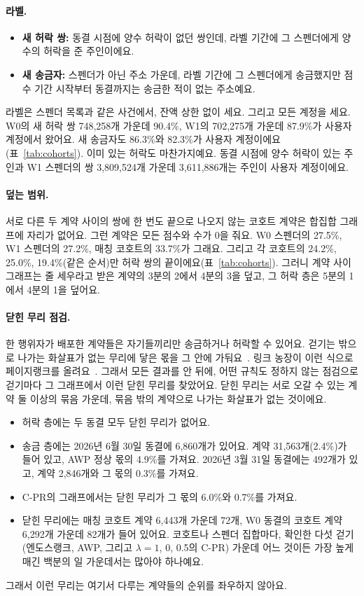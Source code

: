 \paragraph{라벨.}
\begin{itemize}
\item \textbf{새 허락 쌍:} 동결 시점에 양수 허락이 없던 쌍인데, 라벨 기간에 그 스펜더에게 양수의 허락을 준 주인이에요.
\item \textbf{새 송금자:} 스펜더가 아닌 주소 가운데, 라벨 기간에 그 스펜더에게 송금했지만 점수 기간 시작부터 동결까지는 송금한 적이 없는 주소예요.
\end{itemize}
라벨은 스펜더 목록과 같은 사건에서, 잔액 상한 없이 세요. 그리고 모든 계정을 세요. W0의 새 허락 쌍 748,258개 가운데 90.4\%, W1의 702,275개 가운데 87.9\%가 사용자 계정에서 왔어요. 새 송금자도 86.3\%와 82.3\%가 사용자 계정이에요(표~\ref{tab:cohorts}). 이미 있는 허락도 마찬가지예요. 동결 시점에 양수 허락이 있는 주인과 W1 스펜더의 쌍 3,809,524개 가운데 3,611,886개는 주인이 사용자 계정이에요.

\paragraph{덮는 범위.}
서로 다른 두 계약 사이의 쌍에 한 번도 끝으로 나오지 않는 코호트 계약은 합집합 그래프에 자리가 없어요. 그런 계약은 모든 점수와 수가 0을 줘요. W0 스펜더의 27.5\%, W1 스펜더의 27.2\%, 매칭 코호트의 33.7\%가 그래요. 그리고 각 코호트의 24.2\%, 25.0\%, 19.4\%(같은 순서)만 허락 쌍의 끝이에요(표~\ref{tab:cohorts}). 그러니 계약 사이 그래프는 줄 세우라고 받은 계약의 3분의 2에서 4분의 3을 덮고, 그 허락 층은 5분의 1에서 4분의 1을 덮어요.

\paragraph{닫힌 무리 점검.}
한 행위자가 배포한 계약들은 자기들끼리만 송금하거나 허락할 수 있어요. 걷기는 밖으로 나가는 화살표가 없는 무리에 닿은 몫을 그 안에 가둬요~\cite{langville2006pagerank}. 링크 농장이 이런 식으로 페이지랭크를 올려요~\cite{gyongyi2005alliances}. 그래서 모든 결과를 안 뒤에, 어떤 규칙도 정하지 않는 점검으로 걷기마다 그 그래프에서 이런 닫힌 무리를 찾았어요. 닫힌 무리는 서로 오갈 수 있는 계약 둘 이상의 묶음 가운데, 묶음 밖의 계약으로 나가는 화살표가 없는 것이에요.
\begin{itemize}
\item 허락 층에는 두 동결 모두 닫힌 무리가 없어요.
\item 송금 층에는 2026년 6월 30일 동결에 6,860개가 있어요. 계약 31,563개(2.4\%)가 들어 있고, AWP 정상 몫의 4.9\%를 가져요. 2026년 3월 31일 동결에는 492개가 있고, 계약 2,846개와 그 몫의 0.3\%를 가져요.
\item C-PR의 그래프에서는 닫힌 무리가 그 몫의 6.0\%와 0.7\%를 가져요.
\item 닫힌 무리에는 매칭 코호트 계약 6,443개 가운데 72개, W0 동결의 코호트 계약 6,292개 가운데 82개가 들어 있어요. 코호트나 스펜더 집합마다, 확인한 다섯 걷기(엔도스랭크, AWP, 그리고 $\lambda=1$, 0, 0.5의 C-PR) 가운데 어느 것이든 가장 높게 매긴 백분의 일 가운데서는 많아야 하나예요.
\end{itemize}
그래서 이런 무리는 여기서 다루는 계약들의 순위를 좌우하지 않아요.

